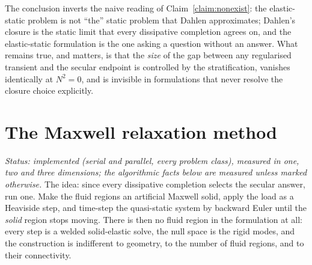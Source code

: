 \documentclass[11pt]{article}
\begin{document}
\noindent
The conclusion inverts the naive reading of
Claim~\ref{claim:nonexist}: the elastic-static problem is not
``the'' static problem that Dahlen approximates; Dahlen's closure is
the static limit that every dissipative completion agrees on, and the
elastic-static formulation is the one asking a question without an
answer. What remains true, and matters, is that the \emph{size} of
the gap between any regularised transient and the secular endpoint is
controlled by the stratification, vanishes identically at
$N^2 = 0$, and is invisible in formulations that never resolve the
closure choice explicitly.

\section{The Maxwell relaxation method}
\label{sec:maxwell}

\emph{Status: implemented (serial and parallel, every problem class),
measured in one, two and three dimensions; the algorithmic facts
below are measured unless marked otherwise.} The idea: since every dissipative completion selects the secular
answer, run one. Make the fluid regions an artificial Maxwell solid,
apply the load as a Heaviside step, and time-step the quasi-static
system by backward Euler until the \emph{solid} region stops moving.
There is then no fluid region in the formulation at all: every step
is a welded solid-elastic solve, the null space is the rigid modes,
and the construction is indifferent to geometry, to the number of
fluid regions, and to their connectivity.
\end{document}
